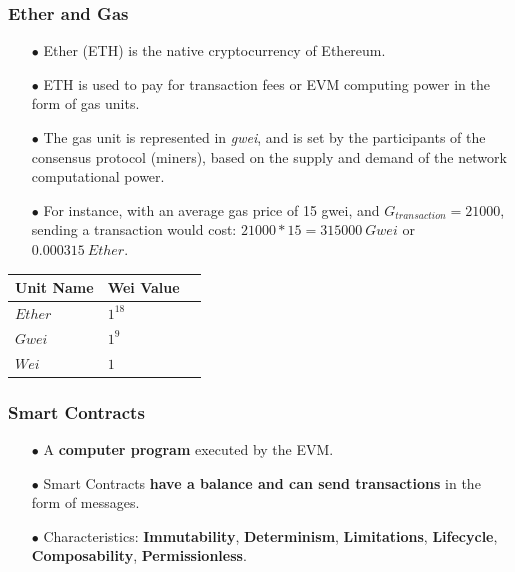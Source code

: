 \documentclass{beamer}
\begin{document}
\begin{frame}
	\frametitle{Ether and Gas}
	\begin{itemize}
		\item[$\bullet$] Ether (ETH) is the native cryptocurrency of Ethereum.
		\item[$\bullet$] ETH is used to pay for transaction fees or EVM computing power in the form of gas units.
		\item[$\bullet$] The gas unit is represented in \textit{gwei}, and is set by the participants of the consensus protocol (miners), based on the supply and demand of the network computational power.
		\item[$\bullet$] For instance, with an average gas price of 15 gwei, and $G_{transaction} = 21000$, sending a transaction would cost: $21000*15 = 315000~Gwei$ or $0.000315~Ether.$
	\end{itemize}

\begin{table}[htp]
	\centering
	\begin{tabular}{|l|l|l|}
		\hline
		\multicolumn{1}{|c|}{\textbf{Unit Name}} & 
		\multicolumn{1}{|c|}{\textbf{Wei Value}} \\\hline
		$Ether$ & $1^{18}$  \\\hline
		$Gwei$  & $1^{9}$  \\\hline
		$Wei$   & $1$     \\\hline   
	\end{tabular}
\end{table}

\end{frame}


\begin{frame}
	\frametitle{Smart Contracts}
	\begin{itemize}
		\item[$\bullet$] A \textbf{computer program} executed by the EVM.
		\item[$\bullet$] Smart Contracts \textbf{have a balance and can send transactions} in the form of messages.
		\item[$\bullet$] Characteristics: \textbf{Immutability}, \textbf{Determinism}, \textbf{Limitations}, \textbf{Lifecycle}, \textbf{Composability}, \textbf{Permissionless}.
	\end{itemize}
\end{frame}
\end{document}
